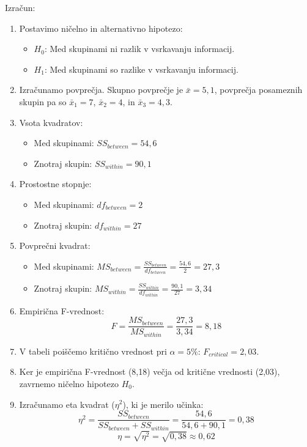 Izračun:
\begin{enumerate}
    \item Postavimo ničelno in alternativno hipotezo:
        \begin{itemize}
            \item $H_0$: Med skupinami ni razlik v vsrkavanju informacij.
            \item $H_1$: Med skupinami so razlike v vsrkavanju informacij.
        \end{itemize}
    \item Izračunamo povprečja. Skupno povprečje je $\bar{x} = 5,1$, povprečja posameznih skupin pa so $\bar{x}_1 = 7$, $\bar{x}_2 = 4$, in $\bar{x}_3 = 4,3$.
    \item Vsota kvadratov:
        \begin{itemize}
            \item Med skupinami: $SS_{between} = 54,6$
            \item Znotraj skupin: $SS_{within} = 90,1$
        \end{itemize}
    \item Prostostne stopnje:
        \begin{itemize}
            \item Med skupinami: $df_{between} = 2$
            \item Znotraj skupin: $df_{within} = 27$
        \end{itemize}
    \item Povprečni kvadrat:
        \begin{itemize}
            \item Med skupinami: $MS_{between} = \frac{SS_{between}}{df_{between}} = \frac{54,6}{2} = 27,3$
            \item Znotraj skupin: $MS_{within} = \frac{SS_{within}}{df_{within}} = \frac{90,1}{27} = 3,34$
        \end{itemize}
    \item Empirična F-vrednost: 
        \[F = \frac{MS_{between}}{MS_{within}} = \frac{27,3}{3,34} = 8,18\]
    \item V tabeli poiščemo kritično vrednost pri $\alpha = 5\%$: $F_{critical} = 2,03$.
    \item Ker je empirična F-vrednost (8,18) večja od kritične vrednosti (2,03), zavrnemo ničelno hipotezo $H_0$.
    \item Izračunamo eta kvadrat ($\eta^2$), ki je merilo učinka:
        \[\eta^2 = \frac{SS_{between}}{SS_{between} + SS_{within}} = \frac{54,6}{54,6 + 90,1} = 0,38\]
        \[ \eta = \sqrt{\eta^2} = \sqrt{0,38} \approx 0,62\]
\end{enumerate}

